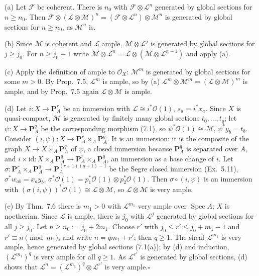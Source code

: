 \documentclass[11pt]{article}
\begin{document}
(a) Let $\mathcal F$ be coherent. There is $n_0$ with $\mathcal F\otimes\mathcal L^n$ generated by global sections for $n\ge n_0$. Then $\mathcal F\otimes(\mathcal L\otimes\mathcal M)^n=(\mathcal F\otimes\mathcal L^n)\otimes\mathcal M^n$ is generated by global sections for $n\ge n_0$, as $\mathcal M^n$ is.

(b) Since $\mathcal M$ is coherent and $\mathcal L$ ample, $\mathcal M\otimes\mathcal L^{j}$ is generated by global sections for $j\ge j_0$. For $n\ge j_0+1$ write $\mathcal M\otimes\mathcal L^n=\mathcal L\otimes(\mathcal M\otimes\mathcal L^{n-1})$ and apply (a).

(c) Apply the definition of ample to $\mathcal O_X$: $\mathcal M^{m}$ is generated by global sections for some $m>0$. By Prop.~7.5, $\mathcal L^m$ is ample, so by (a) $\mathcal L^m\otimes\mathcal M^m=(\mathcal L\otimes\mathcal M)^m$ is ample, and by Prop.~7.5 again $\mathcal L\otimes\mathcal M$ is ample.

(d) Let $i:X\to\mathbf P^r_A$ be an immersion with $\mathcal L\cong i^*\mathcal O(1)$, $s_a=i^*x_a$. Since $X$ is quasi-compact, $\mathcal M$ is generated by finitely many global sections $t_0,\dots,t_q$; let $\psi:X\to\mathbf P^q_A$ be the corresponding morphism (7.1), so $\psi^*\mathcal O(1)\cong\mathcal M$, $\psi^*y_b=t_b$. Consider $(i,\psi):X\to\mathbf P^r_A\times_A\mathbf P^q_A$. It is an immersion: it is the composite of the graph $X\to X\times_A\mathbf P^q_A$ of $\psi$, a closed immersion because $\mathbf P^q_A$ is separated over $A$, and $i\times\mathrm{id}:X\times_A\mathbf P^q_A\to\mathbf P^r_A\times_A\mathbf P^q_A$, an immersion as a base change of $i$. Let $\sigma:\mathbf P^r_A\times_A\mathbf P^q_A\to\mathbf P^{(r+1)(q+1)-1}_A$ be the Segre closed immersion (Ex.~5.11), $\sigma^*w_{ab}=x_ay_b$, $\sigma^*\mathcal O(1)=p_1^*\mathcal O(1)\otimes p_2^*\mathcal O(1)$. Then $\sigma\circ(i,\psi)$ is an immersion with $(\sigma(i,\psi))^*\mathcal O(1)\cong\mathcal L\otimes\mathcal M$, so $\mathcal L\otimes\mathcal M$ is very ample.

(e) By Thm.~7.6 there is $m_1>0$ with $\mathcal L^{m_1}$ very ample over $\operatorname{Spec}A$; $X$ is noetherian. Since $\mathcal L$ is ample, there is $j_0$ with $\mathcal L^j$ generated by global sections for all $j\ge j_0$. Let $n\ge n_0:=j_0+2m_1$. Choose $r'$ with $j_0\le r'\le j_0+m_1-1$ and $r'\equiv n\pmod{m_1}$, and write $n=qm_1+r'$; then $q\ge1$. The sheaf $\mathcal L^{m_1}$ is very ample, hence generated by global sections (7.1(a)); by (d) and induction, $(\mathcal L^{m_1})^q$ is very ample for all $q\ge1$. As $\mathcal L^{r'}$ is generated by global sections, (d) shows that $\mathcal L^n=(\mathcal L^{m_1})^q\otimes\mathcal L^{r'}$ is very ample.\hfill$\square$
\end{document}
